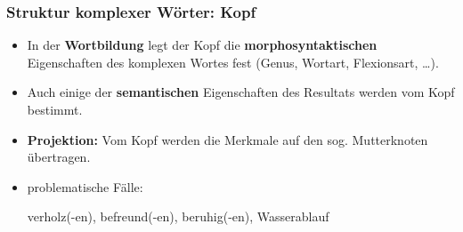 \begin{frame}
\frametitle{Struktur komplexer Wörter: Kopf}

\begin{minipage}{.7\textwidth}


\begin{itemize}
	\item In der \textbf{Wortbildung} legt der Kopf die \textbf{morphosyntaktischen} Eigenschaften des komplexen Wortes fest (\zB Genus, Wortart, Flexionsart, \ldots ). 

\medskip
 	
	\item Auch einige der \textbf{semantischen} Eigenschaften des Resultats werden vom Kopf bestimmt.

\medskip
	
	\item \textbf{Projektion:} Vom Kopf werden die Merkmale auf den sog. Mutterknoten übertragen.  

\medskip
	
	\item problematische Fälle:
		
		\ea verholz(-en), befreund(-en), beruhig(-en), Wasserablauf
		\z

\end{itemize}


\end{minipage}
%
\hfill%
%
\begin{minipage}{.29\textwidth}

\begin{figure}	
	\centering


\end{figure}
\end{minipage}
\end{frame}
